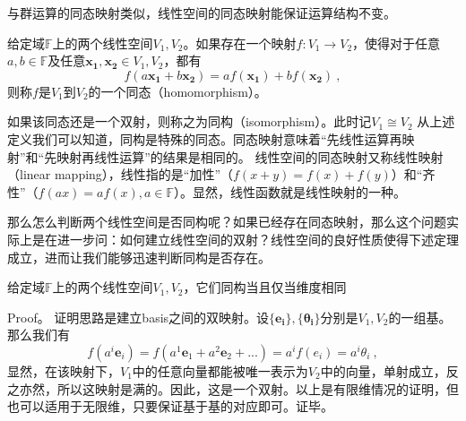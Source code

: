 

与群运算的同态映射类似，线性空间的同态映射能保证运算结构不变。
\begin{definition}{}
给定域$\mathbb F$上的两个线性空间$V_1,V_2$。如果存在一个映射$f:V_1\rightarrow V_2$，使得对于任意$a,b\in \mathbb F$及任意$\boldsymbol{x_1,x_2}\in V_1,V_2$，都有
\begin{equation}
f(a\boldsymbol {x_1}+b\boldsymbol {x_2})=af(\boldsymbol {x_1})+bf(\boldsymbol {x_2})~,
\end{equation}
则称$f$是$V_1$到$V_2$的一个同态（homomorphism）。
\end{definition}
如果该同态还是一个双射，则称之为同构（isomorphism）。此时记$V_1\cong V_2$
从上述定义我们可以知道，同构是特殊的同态。同态映射意味着“先线性运算再映射”和“先映射再线性运算”的结果是相同的。
线性空间的同态映射又称线性映射（linear mapping），线性指的是“加性”（$f(x+y)=f(x)+f(y)$）和“齐性”（$f(ax)=af(x),a\in \mathbb F$）。显然，线性函数就是线性映射的一种。

那么怎么判断两个线性空间是否同构呢？如果已经存在同态映射，那么这个问题实际上是在进一步问：如何建立线性空间的双射？线性空间的良好性质使得下述定理成立，进而让我们能够迅速判断同构是否存在。
\begin{theorem}{}
给定域$\mathbb F$上的两个线性空间$V_1,V_2$，它们同构当且仅当维度相同
\end{theorem}
Proof。
证明思路是建立basis之间的双映射。设$\{\boldsymbol{e_i}\},\{\boldsymbol{\theta_i}\}$分别是$V_1,V_2$的一组基。那么我们有
\begin{equation}
f(a^i\boldsymbol e_i)=f(a^1\boldsymbol e_1+a^2\boldsymbol e_2+...)=a^if(e_i)=a^i\theta_i~,
\end{equation}
显然，在该映射下，$V_1$中的任意向量都能被唯一表示为$V_2$中的向量，单射成立，反之亦然，所以这映射是满的。因此，这是一个双射。以上是有限维情况的证明，但也可以适用于无限维，只要保证基于基的对应即可。证毕。